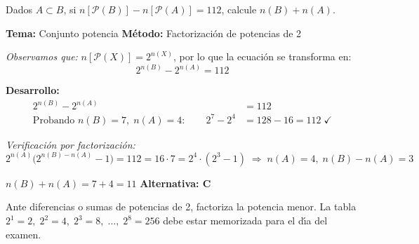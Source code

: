 \begin{tcolorbox}[
  enhanced, breakable,
  colback=GrisClaro, colframe=AzulPizarra,
  fonttitle=\bfseries\sffamily,
  title={Ejercicio 8 --- Nivel Intermedio},
  arc=3pt, boxrule=0.8pt
]
\begin{problema}
  Dados $A \subset B$, si $n[\mathcal{P}(B)] - n[\mathcal{P}(A)] = 112$,
  calcule $n(B) + n(A)$.
\end{problema}

\smallskip
\noindent
\textbf{\sffamily\color{AzulMedio}Tema:} Conjunto potencia
\hfill
\textbf{\sffamily\color{AzulMedio}M\'etodo:} Factorizaci\'on de potencias de 2

\medskip
\noindent\textit{Observamos que:} $n[\mathcal{P}(X)] = 2^{n(X)}$, por lo que la
ecuaci\'on se transforma en:
\[
  2^{n(B)} - 2^{n(A)} = 112
\]

\noindent\textbf{\sffamily Desarrollo:}
\begin{align*}
  2^{n(B)} - 2^{n(A)} &= 112 \\
  \text{Probando } n(B)=7,\; n(A)=4: \qquad
  2^{7} - 2^{4} &= 128 - 16 = 112 \;\checkmark
\end{align*}

\noindent\textit{Verificaci\'on por factorizaci\'on:}
\[
  2^{n(A)}\bigl(2^{n(B)-n(A)}-1\bigr) = 112
  = 16 \cdot 7 = 2^{4}\cdot(2^{3}-1)
  \;\Rightarrow\; n(A)=4,\; n(B)-n(A)=3
\]

\begin{tcolorbox}[
  colback=AzulClaro!60, colframe=AzulPizarra,
  arc=2pt, boxrule=0.8pt, left=8pt, right=8pt
]
\centering
$\displaystyle \boxed{n(B) + n(A) = 7 + 4 = 11}$ \quad
\textbf{Alternativa: C}
\end{tcolorbox}

\begin{cajatip}
  Ante diferencias o sumas de potencias de 2, factoriza la potencia menor.
  La tabla $2^{1}\!=\!2,\;2^{2}\!=\!4,\;2^{3}\!=\!8,\;\ldots,\;2^{8}\!=\!256$
  debe estar memorizada para el d\'{\i}a del examen.
\end{cajatip}
\end{tcolorbox}

\vspace{0.5cm}

